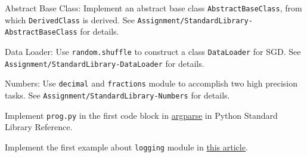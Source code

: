\documentclass[english]{../TeXTemplate/pkupaper}
\begin{document}
\begin{thmque}
Abstract Base Class: Implement an abstract base class \verb"AbstractBaseClass", from which \verb"DerivedClass" is derived. See \verb"Assignment/StandardLibrary-AbstractBaseClass" for details.
\end{thmque}
\begin{thmque}
Data Loader: Use \verb"random.shuffle" to construct a class \verb"DataLoader" for SGD. See \verb"Assignment/StandardLibrary-DataLoader" for details.
\end{thmque}
\begin{thmque}
Numbers: Use \verb"decimal" and \verb"fractions" module to accomplish two high precision tasks. See \verb"Assignment/StandardLibrary-Numbers" for details.
\end{thmque}
\begin{thmque}
Implement \verb"prog.py" in the first code block in \href{https://docs.python.org/3/library/argparse.html}{argparse} in Python Standard Library Reference.
\end{thmque}
\begin{thmque}
Implement the first example about \verb"logging" module in \href{http://python.jobbole.com/86887/}{this article}.
\end{thmque}
\end{document}
